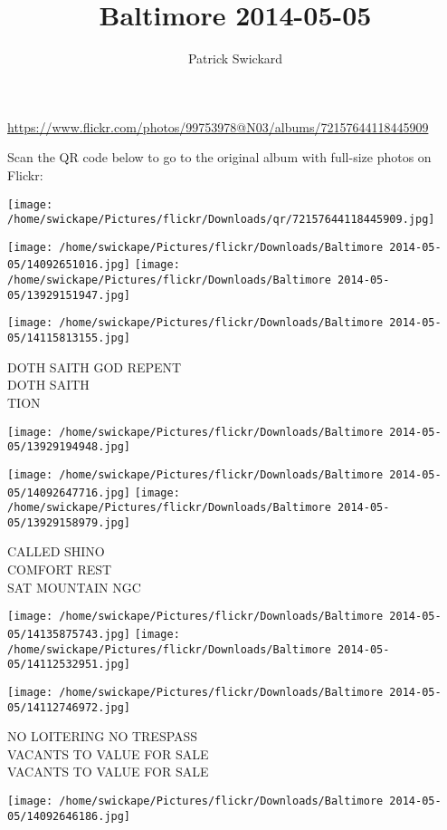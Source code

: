 \documentclass[10pt,letterpaper]{article}
\title{Baltimore 2014-05-05}
\author{Patrick Swickard}
\date{}
\begin{document}
\maketitle

\url{https://www.flickr.com/photos/99753978@N03/albums/72157644118445909}

Scan the QR code below to go to the original album with full-size photos on Flickr:

\texttt{[image: /home/swickape/Pictures/flickr/Downloads/qr/72157644118445909.jpg]}
\pagebreak

\texttt{[image: /home/swickape/Pictures/flickr/Downloads/Baltimore 2014-05-05/14092651016.jpg]}
\texttt{[image: /home/swickape/Pictures/flickr/Downloads/Baltimore 2014-05-05/13929151947.jpg]}

\texttt{[image: /home/swickape/Pictures/flickr/Downloads/Baltimore 2014-05-05/14115813155.jpg]}

DOTH SAITH GOD REPENT\\
DOTH SAITH\\
TION
\pagebreak

\texttt{[image: /home/swickape/Pictures/flickr/Downloads/Baltimore 2014-05-05/13929194948.jpg]}

\vspace{0.25in}
\texttt{[image: /home/swickape/Pictures/flickr/Downloads/Baltimore 2014-05-05/14092647716.jpg]}
\texttt{[image: /home/swickape/Pictures/flickr/Downloads/Baltimore 2014-05-05/13929158979.jpg]}

CALLED SHINO\\
COMFORT REST\\
SAT MOUNTAIN NGC
\pagebreak

\texttt{[image: /home/swickape/Pictures/flickr/Downloads/Baltimore 2014-05-05/14135875743.jpg]}
\texttt{[image: /home/swickape/Pictures/flickr/Downloads/Baltimore 2014-05-05/14112532951.jpg]}

\texttt{[image: /home/swickape/Pictures/flickr/Downloads/Baltimore 2014-05-05/14112746972.jpg]}

NO LOITERING NO TRESPASS\\
VACANTS TO VALUE FOR SALE\\
VACANTS TO VALUE FOR SALE
\pagebreak

\texttt{[image: /home/swickape/Pictures/flickr/Downloads/Baltimore 2014-05-05/14092646186.jpg]}
\end{document}
